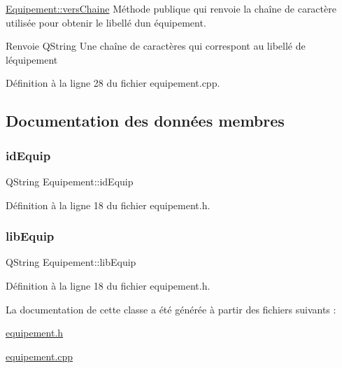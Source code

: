 \hyperlink{class_equipement_a5e45c0b5524b353c77a23b618d73a1d0}{Equipement\+::vers\+Chaine} Méthode publique qui renvoie la chaîne de caractère utilisée pour obtenir le libellé d\textquotesingle{}un équipement. 

\begin{DoxyReturn}{Renvoie}
Q\+String Une chaîne de caractères qui correspont au libellé de l\textquotesingle{}équipement 
\end{DoxyReturn}


Définition à la ligne 28 du fichier equipement.\+cpp.



\subsection{Documentation des données membres}
\mbox{\label{class_equipement_a140b7498ba59bdacb3f57a924b2853ad}} 
\subsubsection{\texorpdfstring{id\+Equip}{idEquip}}
{\footnotesize\ttfamily Q\+String Equipement\+::id\+Equip\hspace{0.3cm}{\ttfamily [private]}}



Définition à la ligne 18 du fichier equipement.\+h.

\mbox{\label{class_equipement_a69e0291bded262f34fe2ba57ad4cf99a}} 
\subsubsection{\texorpdfstring{lib\+Equip}{libEquip}}
{\footnotesize\ttfamily Q\+String Equipement\+::lib\+Equip\hspace{0.3cm}{\ttfamily [private]}}



Définition à la ligne 18 du fichier equipement.\+h.



La documentation de cette classe a été générée à partir des fichiers suivants \+:\begin{DoxyCompactItemize}
\item 
\hyperlink{equipement_8h}{equipement.\+h}\item 
\hyperlink{equipement_8cpp}{equipement.\+cpp}\end{DoxyCompactItemize}
